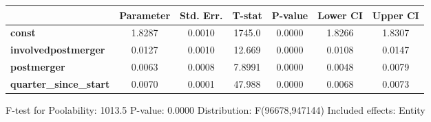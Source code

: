 \documentclass{report}
\begin{document}
\begin{center}
\begin{tabular}{lcccccc}
                               & \textbf{Parameter} & \textbf{Std. Err.} & \textbf{T-stat} & \textbf{P-value} & \textbf{Lower CI} & \textbf{Upper CI}  \\
\midrule
\textbf{const}                 &       1.8287       &       0.0010       &      1745.0     &      0.0000      &       1.8266      &       1.8307       \\
\textbf{involvedpostmerger}    &       0.0127       &       0.0010       &      12.669     &      0.0000      &       0.0108      &       0.0147       \\
\textbf{postmerger}            &       0.0063       &       0.0008       &      7.8991     &      0.0000      &       0.0048      &       0.0079       \\
\textbf{quarter\_since\_start} &       0.0070       &       0.0001       &      47.988     &      0.0000      &       0.0068      &       0.0073       \\
\bottomrule
\end{tabular}
\end{center}

F-test for Poolability: 1013.5 \newline
 P-value: 0.0000 \newline
 Distribution: F(96678,947144) \newline
  \newline
 Included effects: Entity
\end{document}
